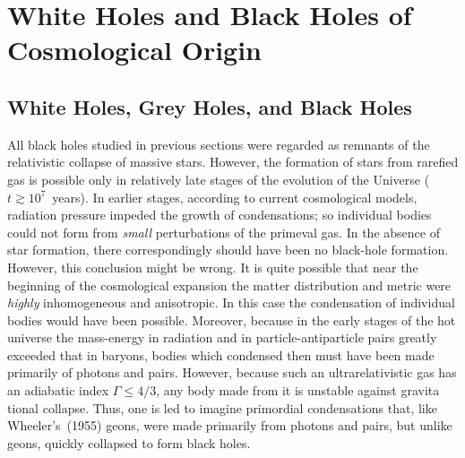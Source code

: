 
\section{White Holes and Black Holes of Cosmological Origin}
\label{sec:6}


\subsection{White Holes, Grey Holes, and Black Holes}
\label{sec:6.1}

All black holes studied in previous sections were regarded as remnants of the
relativistic collapse of massive stars. However, the formation of stars from rarefied
gas is possible only in relatively late stages of the evolution of the Universe
($t \gtrsim 10^7$~years). In earlier stages, according to current cosmological models,
radiation pressure impeded the growth of condensations; so individual bodies
could not form from \emph{small} perturbations of the primeval gas. In the absence of
star formation, there correspondingly should have been no black-hole formation.
However, this conclusion might be wrong. It is quite possible that near the
beginning of the cosmological expansion the matter distribution and metric were
\emph{highly} inhomogeneous and anisotropic. In this case the condensation of individual
bodies would have been possible. Moreover, because in the early stages of the hot
universe the mass-energy in radiation and in particle-antiparticle pairs greatly
exceeded that in baryons, bodies which condensed then must have been made
primarily of photons and pairs. However, because such an ultrarelativistic gas has
an adiabatic index $\Gamma \leq 4/3$, any body made from it is unstable against gravita\-
tional collapse. Thus, one is led to imagine primordial condensations that, like
Wheeler's~(1955) \cite{Wheeler1955} geons, were made primarily from photons and pairs, but unlike
geons, quickly collapsed to form black holes.

